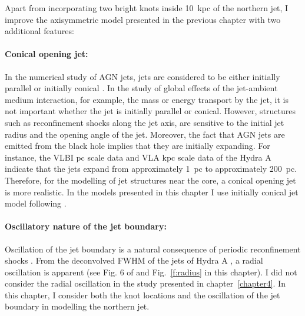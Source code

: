 Apart from incorporating two bright knots inside 10~kpc of the northern jet, I improve the axisymmetric model presented in the previous chapter with two additional features:

\paragraph{Conical opening jet:} In the numerical study of AGN jets, jets are considered to be either initially parallel \citep{sutherland07, wagner11} or initially conical \citep{komissarov98,krause12}. In the study of global effects of the jet-ambient medium interaction, for example, the mass or energy transport by the jet, it is not important whether the jet is initially parallel or conical. However, structures such as reconfinement shocks along the jet axis, are sensitive to the initial jet radius and the opening angle of the jet. Moreover, the fact that AGN jets are emitted from the black hole implies that they are initially expanding. For instance, the VLBI pc scale data \citep{taylor96} and VLA kpc scale data \citep{taylor90} of the Hydra A indicate that the jets expand from approximately 1~pc to approximately 200~pc. Therefore, for the modelling of jet structures near the core, a conical opening jet is more realistic. In the models presented in this chapter I use initially conical jet model following \citet{komissarov98}. 

\paragraph{Oscillatory nature of the jet boundary:} Oscillation of the jet boundary is a natural consequence of periodic reconfinement shocks \citep{prandtl1907, sanders83}. From the deconvolved FWHM of the jets of Hydra A \citep{taylor90}, a radial oscillation is apparent (see Fig. 6 of \citet{taylor90} and Fig.~\ref{f:radius} in this chapter). I did not consider the radial oscillation in the study presented in chapter~\ref{chapter4}. In this chapter, I consider both the knot locations and the oscillation of the jet boundary in modelling the northern jet.

